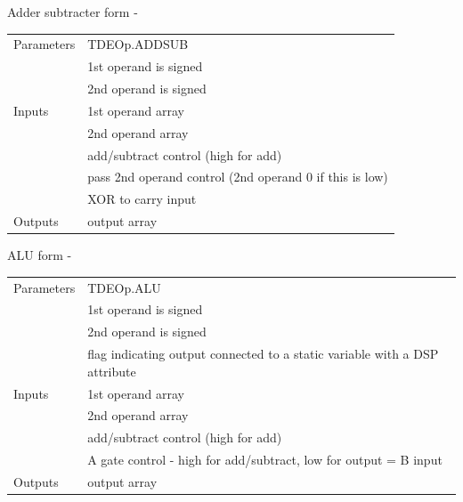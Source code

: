\documentclass[10pt,a4paper,twoside,fleqn]{book}
\begin{document}
                    Adder subtracter form -

                    \begin{tabular}{| l | l |}
                    \hline
                    Parameters  & TDEOp.ADDSUB \\
                                & 1st operand is signed \\
                                & 2nd operand is signed \\
                    \hline
                    Inputs      & 1st operand array \\
                                & 2nd operand array \\
                                & add/subtract control (high for add) \\
                                & pass 2nd operand control (2nd operand 0 if this is
                                  low) \\
                                & XOR to carry input \\
                    \hline
                    Outputs     & output array \\
                    \hline
                    \end{tabular}
                    
                    ALU form -

                    \begin{tabular}{| l | l |}
                    \hline
                    Parameters  & TDEOp.ALU \\
                                & 1st operand is signed \\
                                & 2nd operand is signed \\
                                & flag indicating output connected to
                                  a static variable with a DSP attribute \\
                    \hline
                    Inputs      & 1st operand array \\
                                & 2nd operand array \\
                                & add/subtract control (high for add) \\
                                & A gate control - high for add/subtract, low for
                                  output = B input \\
                    \hline
                    Outputs     & output array \\
                    \hline
                    \end{tabular}
                    
\end{document}
